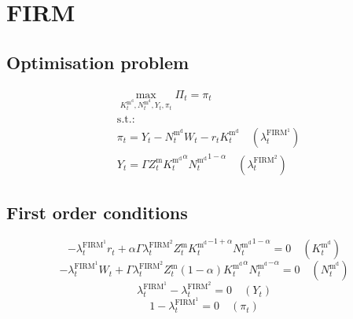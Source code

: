 \section{FIRM}

\subsection{Optimisation problem}

\begin{align}
&\max_{K^{\mathrm{m}^{\mathrm{d}}}_{t}, N^{\mathrm{m}^{\mathrm{d}}}_{t}, Y_{t}, \pi_{t}
} \Pi_{t} = \pi_{t}\\
&\mathrm{s.t.:}\nonumber\\
& \pi_{t} = Y_{t} - {N^{\mathrm{m}^{\mathrm{d}}}_{t}} {W_{t}} - {r_{t}} {K^{\mathrm{m}^{\mathrm{d}}}_{t}} \quad \left(\lambda^{\mathrm{FIRM}^{\mathrm{1}}}_{t}\right)\\
& Y_{t} = {\Gamma} {Z^{\mathrm{m}}_{t}} {{K^{\mathrm{m}^{\mathrm{d}}}_{t}}^{\alpha}} {{N^{\mathrm{m}^{\mathrm{d}}}_{t}}^{1 - \alpha}} \quad \left(\lambda^{\mathrm{FIRM}^{\mathrm{2}}}_{t}\right)
\end{align}


\subsection{First order conditions}

\begin{equation}
-{\lambda^{\mathrm{FIRM}^{\mathrm{1}}}_{t}} {r_{t}} + {\alpha} {\Gamma} {\lambda^{\mathrm{FIRM}^{\mathrm{2}}}_{t}} {Z^{\mathrm{m}}_{t}} {{K^{\mathrm{m}^{\mathrm{d}}}_{t}}^{-1 + \alpha}} {{N^{\mathrm{m}^{\mathrm{d}}}_{t}}^{1 - \alpha}} = 0
 \quad \left(K^{\mathrm{m}^{\mathrm{d}}}_{t}\right)
\end{equation}
\begin{equation}
-{\lambda^{\mathrm{FIRM}^{\mathrm{1}}}_{t}} {W_{t}} + {\Gamma} {\lambda^{\mathrm{FIRM}^{\mathrm{2}}}_{t}} {Z^{\mathrm{m}}_{t}} \left(1 - \alpha\right) {{K^{\mathrm{m}^{\mathrm{d}}}_{t}}^{\alpha}} {{N^{\mathrm{m}^{\mathrm{d}}}_{t}}^{-\alpha}} = 0
 \quad \left(N^{\mathrm{m}^{\mathrm{d}}}_{t}\right)
\end{equation}
\begin{equation}
\lambda^{\mathrm{FIRM}^{\mathrm{1}}}_{t} - \lambda^{\mathrm{FIRM}^{\mathrm{2}}}_{t} = 0
 \quad \left(Y_{t}\right)
\end{equation}
\begin{equation}
1 - \lambda^{\mathrm{FIRM}^{\mathrm{1}}}_{t} = 0
 \quad \left(\pi_{t}\right)
\end{equation}


